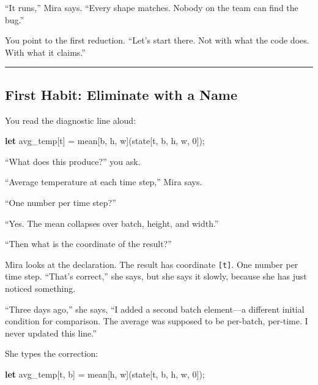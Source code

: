 \documentclass[11pt,]{article}
\newenvironment{Shaded}{}{}
\newcommand{\DecValTok}[1]{\textcolor[rgb]{0.25,0.63,0.44}{#1}}
\newcommand{\KeywordTok}[1]{\textcolor[rgb]{0.00,0.44,0.13}{\textbf{#1}}}
\newcommand{\NormalTok}[1]{#1}
\newcommand{\OperatorTok}[1]{\textcolor[rgb]{0.40,0.40,0.40}{#1}}
\begin{document}
``It runs,'' Mira says. ``Every shape matches. Nobody on the team can
find the bug.''

You point to the first reduction. ``Let's start there. Not with what the
code does. With what it claims.''

\begin{center}\rule{0.5\linewidth}{0.4pt}\end{center}

\hypertarget{first-habit-eliminate-with-a-name}{%
\subsection{First Habit: Eliminate with a
Name}\label{first-habit-eliminate-with-a-name}}

You read the diagnostic line aloud:

\begin{Shaded}
\begin{Highlighting}[]
\KeywordTok{let}\NormalTok{ avg_temp}\OperatorTok{[}\NormalTok{t}\OperatorTok{]}\NormalTok{ = mean}\OperatorTok{[}\NormalTok{b, h, w}\OperatorTok{]}\NormalTok{(state}\OperatorTok{[}\NormalTok{t, b, h, w, }\DecValTok{0}\OperatorTok{]}\NormalTok{);}
\end{Highlighting}
\end{Shaded}

``What does this produce?'' you ask.

``Average temperature at each time step,'' Mira says.

``One number per time step?''

``Yes. The mean collapses over batch, height, and width.''

``Then what is the coordinate of the result?''

Mira looks at the declaration. The result has coordinate
\texttt{{[}t{]}}. One number per time step. ``That's correct,'' she
says, but she says it slowly, because she has just noticed something.

``Three days ago,'' she says, ``I added a second batch element---a
different initial condition for comparison. The average was supposed to
be per-batch, per-time. I never updated this line.''

She types the correction:

\begin{Shaded}
\begin{Highlighting}[]
\KeywordTok{let}\NormalTok{ avg_temp}\OperatorTok{[}\NormalTok{t, b}\OperatorTok{]}\NormalTok{ = mean}\OperatorTok{[}\NormalTok{h, w}\OperatorTok{]}\NormalTok{(state}\OperatorTok{[}\NormalTok{t, b, h, w, }\DecValTok{0}\OperatorTok{]}\NormalTok{);}
\end{Highlighting}
\end{Shaded}
\end{document}
